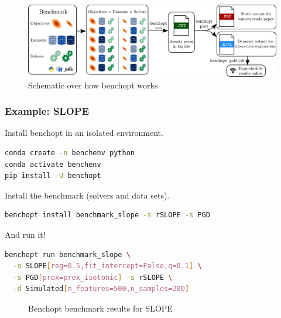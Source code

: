 \documentclass[10pt]{beamer}
\begin{document}
\begin{frame}[c]
  \begin{figure}[htpb]
    \centering
    \includegraphics[width=\textwidth]{figures/paper4-benchopt_schema.pdf}
    \caption{%
      Schematic over how benchopt works
    }
  \end{figure}
\end{frame}

\begin{frame}[fragile]
  \frametitle{Example: SLOPE}

  Install benchopt in an isolated environment.
  \begin{lstlisting}[language=bash,basicstyle=\ttfamily\small]
conda create -n benchenv python
conda activate benchenv
pip install -U benchopt
\end{lstlisting}

  \pause\medskip

  Install the benchmark (solvers and data sets).
  \begin{lstlisting}[language=bash,basicstyle=\ttfamily\small]
benchopt install benchmark_slope -s rSLOPE -s PGD
\end{lstlisting}

  \pause\medskip

  And run it!

  \begin{lstlisting}[language=bash,basicstyle=\ttfamily\small]
benchopt run benchmark_slope \
  -o SLOPE[reg=0.5,fit_intercept=False,q=0.1] \
  -s PGD[prox=prox_isotonic] -s rSLOPE \
  -d Simulated[n_features=500,n_samples=200]
\end{lstlisting}

\end{frame}

\begin{frame}[c]
  \begin{figure}[htpb]
    \centering
    \caption{%
      Benchopt benchmark results for SLOPE
    }
  \end{figure}
\end{frame}
\end{document}
